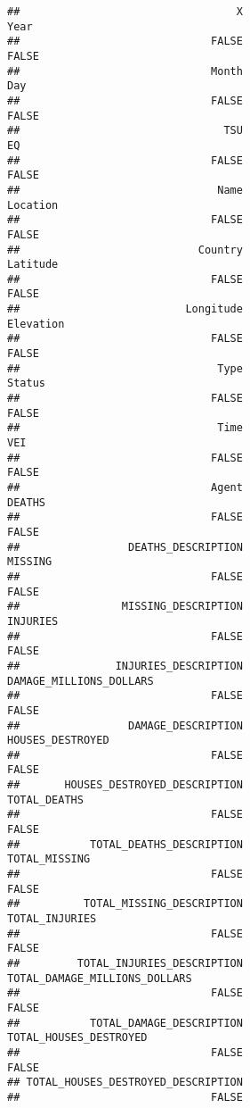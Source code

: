 \documentclass[
]{article}
\begin{document}
\begin{verbatim}
##                                  X                               Year 
##                              FALSE                              FALSE 
##                              Month                                Day 
##                              FALSE                              FALSE 
##                                TSU                                 EQ 
##                              FALSE                              FALSE 
##                               Name                           Location 
##                              FALSE                              FALSE 
##                            Country                           Latitude 
##                              FALSE                              FALSE 
##                          Longitude                          Elevation 
##                              FALSE                              FALSE 
##                               Type                             Status 
##                              FALSE                              FALSE 
##                               Time                                VEI 
##                              FALSE                              FALSE 
##                              Agent                             DEATHS 
##                              FALSE                              FALSE 
##                 DEATHS_DESCRIPTION                            MISSING 
##                              FALSE                              FALSE 
##                MISSING_DESCRIPTION                           INJURIES 
##                              FALSE                              FALSE 
##               INJURIES_DESCRIPTION            DAMAGE_MILLIONS_DOLLARS 
##                              FALSE                              FALSE 
##                 DAMAGE_DESCRIPTION                   HOUSES_DESTROYED 
##                              FALSE                              FALSE 
##       HOUSES_DESTROYED_DESCRIPTION                       TOTAL_DEATHS 
##                              FALSE                              FALSE 
##           TOTAL_DEATHS_DESCRIPTION                      TOTAL_MISSING 
##                              FALSE                              FALSE 
##          TOTAL_MISSING_DESCRIPTION                     TOTAL_INJURIES 
##                              FALSE                              FALSE 
##         TOTAL_INJURIES_DESCRIPTION      TOTAL_DAMAGE_MILLIONS_DOLLARS 
##                              FALSE                              FALSE 
##           TOTAL_DAMAGE_DESCRIPTION             TOTAL_HOUSES_DESTROYED 
##                              FALSE                              FALSE 
## TOTAL_HOUSES_DESTROYED_DESCRIPTION 
##                              FALSE
\end{verbatim}
\end{document}
